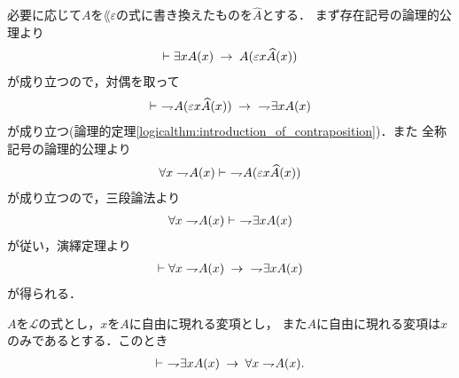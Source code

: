 	\begin{sketch}
		必要に応じて$A$を$\lang{\varepsilon}$の式に書き換えたものを$\widehat{A}$とする．
		まず存在記号の論理的公理より
		\begin{align}
			\vdash \exists x A(x) \hspace{0.25em}\rightarrow\hspace{0.25em} A(\varepsilon x \widehat{A}(x))
		\end{align}
		が成り立つので，対偶を取って
		\begin{align}
			\vdash\ \rightharpoondown\hspace{-0.25em} A(\varepsilon x \widehat{A}(x)) 
			\hspace{0.25em}\rightarrow\hspace{0.25em}\ \rightharpoondown\hspace{-0.25em} \exists x A(x)
		\end{align}
		が成り立つ(論理的定理\ref{logicalthm:introduction_of_contraposition})．また
		全称記号の論理的公理より
		\begin{align}
			\forall x \rightharpoondown\hspace{-0.25em} A(x) \vdash\ \rightharpoondown\hspace{-0.25em} A(\varepsilon x \widehat{A}(x))
		\end{align}
		が成り立つので，三段論法より
		\begin{align}
			\forall x \rightharpoondown\hspace{-0.25em} A(x) \vdash\ \rightharpoondown\hspace{-0.25em} \exists x A(x)
		\end{align}
		が従い，演繹定理より
		\begin{align}
			\vdash \forall x \rightharpoondown\hspace{-0.25em} A(x) \hspace{0.25em}\rightarrow\hspace{0.25em}\ \rightharpoondown\hspace{-0.25em} \exists x A(x)
		\end{align}
		が得られる．
		\QED
	\end{sketch}
	
	\begin{screen}
		\begin{logicalthm}
		\label{logicalthm:strong_De_Morgan_law_for_quantifiers_2}
			$A$を$\mathcal{L}$の式とし，$x$を$A$に自由に現れる変項とし，
			また$A$に自由に現れる変項は$x$のみであるとする．このとき
			\begin{align}
				\vdash\ \rightharpoondown\hspace{-0.25em} \exists x A(x) \hspace{0.25em}\rightarrow\hspace{0.25em} \forall x \rightharpoondown\hspace{-0.25em} A(x).
			\end{align}
		\end{logicalthm}
	\end{screen}
	
